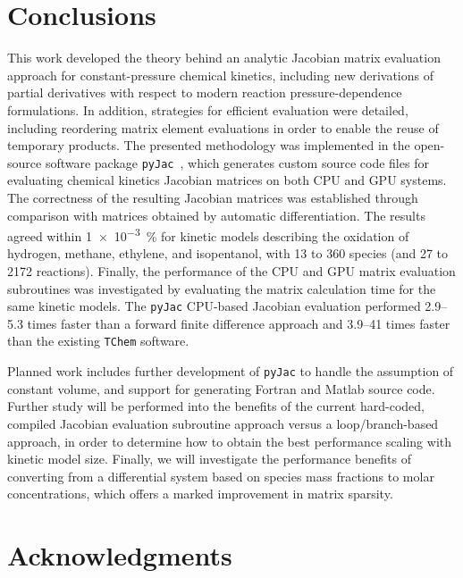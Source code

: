 \documentclass[preprint,12pt]{elsarticle}
\begin{document}
{\section{Conclusions}
\label{S:conclusions}

This work developed the theory behind an analytic Jacobian matrix evaluation approach for constant-pressure chemical kinetics, including new derivations of partial derivatives with respect to modern reaction pressure-dependence formulations.
In addition, strategies for efficient evaluation were detailed, including reordering matrix element evaluations in order to enable the reuse of temporary products.
The presented methodology was implemented in the open-source software package \texttt{pyJac}~\cite{Niemeyer:2015im}, which generates custom source code files for evaluating chemical kinetics Jacobian matrices on both CPU and GPU systems.
The correctness of the resulting Jacobian matrices was established through comparison with matrices obtained by automatic differentiation.
The results agreed within \SI{1e-3}{\percent} for kinetic models describing the oxidation of hydrogen, methane, ethylene, and isopentanol, with 13 to 360 species (and 27 to 2172 reactions).
Finally, the performance of the CPU and GPU matrix evaluation subroutines was investigated by evaluating the matrix calculation time for the same kinetic models.
The \texttt{pyJac} CPU-based Jacobian evaluation performed \numrange{2.9}{5.3} times faster than a forward finite difference approach and \numrange{3.9}{41} times faster than the existing \texttt{TChem} software.

Planned work includes further development of \texttt{pyJac} to handle the assumption of constant volume, and support for generating Fortran and Matlab source code.
Further study will be performed into the benefits of the current hard-coded, compiled Jacobian evaluation subroutine approach versus a loop\slash branch-based approach, in order to determine how to obtain the best performance scaling with kinetic model size.
Finally, we will investigate the performance benefits of converting from a differential system based on species mass fractions to molar concentrations, which offers a marked improvement in matrix sparsity.

\section*{Acknowledgments}

}
\end{document}
